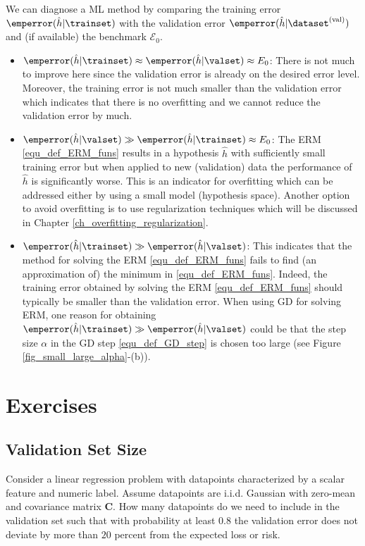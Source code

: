 \documentclass[12pt]{report}
\begin{document}
We can diagnose a ML method by comparing the training error $\emperror(\hat{h}| \trainset)$ 
with the validation error $\emperror(\hat{h}| \dataset^{(\rm val)})$ and (if available) the benchmark $\mathcal{E}_{0}$.
\begin{itemize} 
\item $\emperror(\hat{h}| \trainset) \approx \emperror(\hat{h}| \valset) \approx E_{0}$: 
There is not much to improve here since the validation error is already on the 
desired error level. Moreover, the training error is not much smaller than 
the validation error which indicates that there is no overfitting and we cannot 
reduce the validation error by much. 
\item $\emperror(\hat{h}| \valset) \gg \emperror(\hat{h}| \trainset) \approx E_{0}$: 
The ERM \eqref{equ_def_ERM_funs} results in a hypothesis $\hat{h}$ 
with sufficiently small training error but when applied to new (validation) 
data the performance of $\hat{h}$ is significantly worse. This is an 
indicator for overfitting which can be addressed either by using a small 
model (hypothesis space). Another option to avoid overfitting is to use 
regularization techniques which will be discussed in Chapter \ref{ch_overfitting_regularization}. 
\item $\emperror(\hat{h}| \trainset) \gg \emperror(\hat{h}| \valset)$: 
This indicates that the method for solving the ERM \eqref{equ_def_ERM_funs} 
fails to find (an approximation of) the minimum in \eqref{equ_def_ERM_funs}. 
Indeed, the training error obtained by solving the ERM \eqref{equ_def_ERM_funs} should 
typically be smaller than the validation error. When using GD for solving ERM, 
one reason for obtaining $\emperror(\hat{h}| \trainset) \gg \emperror(\hat{h}| \valset)$ could be that 
the step size $\alpha$ in the GD step \eqref{equ_def_GD_step} is chosen too large 
(see Figure \ref{fig_small_large_alpha}-(b)). 
\end{itemize}

\section{Exercises} 

\subsection{Validation Set Size} 
Consider a linear regression problem with datapoints characterized 
by a scalar feature and numeric label. Assume datapoints are i.i.d. 
Gaussian with zero-mean and covariance matrix $\mathbf{C}$. How 
many datapoints do we need to include in the validation set such 
that with probability at least $0.8$ the validation error does 
not deviate by more than $20$ percent from the expected loss or risk. 
\end{document}
